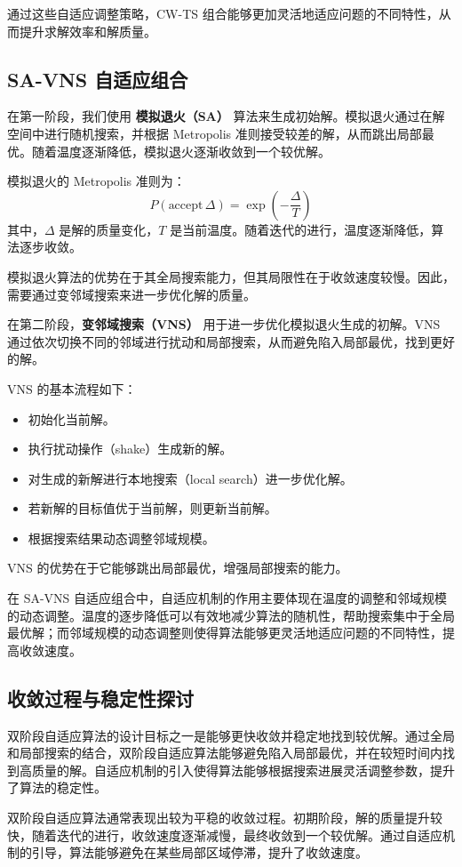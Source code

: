 \documentclass[12pt,a4paper,twoside]{ctexbook}
\begin{document}
通过这些自适应调整策略，CW-TS 组合能够更加灵活地适应问题的不同特性，从而提升求解效率和解质量。

\subsection{SA-VNS 自适应组合}
在第一阶段，我们使用 \textbf{模拟退火（SA）} 算法来生成初始解。模拟退火通过在解空间中进行随机搜索，并根据 Metropolis 准则接受较差的解，从而跳出局部最优。随着温度逐渐降低，模拟退火逐渐收敛到一个较优解。

模拟退火的 Metropolis 准则为：
\[
P(\text{accept}\,\Delta) = \exp\left(-\frac{\Delta}{T}\right)
\]
其中，$\Delta$ 是解的质量变化，$T$ 是当前温度。随着迭代的进行，温度逐渐降低，算法逐步收敛。

模拟退火算法的优势在于其全局搜索能力，但其局限性在于收敛速度较慢。因此，需要通过变邻域搜索来进一步优化解的质量。

在第二阶段，\textbf{变邻域搜索（VNS）} 用于进一步优化模拟退火生成的初解。VNS 通过依次切换不同的邻域进行扰动和局部搜索，从而避免陷入局部最优，找到更好的解。

VNS 的基本流程如下：
\begin{itemize}
    \item 初始化当前解。
    \item 执行扰动操作（shake）生成新的解。
    \item 对生成的新解进行本地搜索（local search）进一步优化解。
    \item 若新解的目标值优于当前解，则更新当前解。
    \item 根据搜索结果动态调整邻域规模。
\end{itemize}

VNS 的优势在于它能够跳出局部最优，增强局部搜索的能力。


在 SA-VNS 自适应组合中，自适应机制的作用主要体现在温度的调整和邻域规模的动态调整。温度的逐步降低可以有效地减少算法的随机性，帮助搜索集中于全局最优解；而邻域规模的动态调整则使得算法能够更灵活地适应问题的不同特性，提高收敛速度。

\subsection{收敛过程与稳定性探讨}
双阶段自适应算法的设计目标之一是能够更快收敛并稳定地找到较优解。通过全局和局部搜索的结合，双阶段自适应算法能够避免陷入局部最优，并在较短时间内找到高质量的解。自适应机制的引入使得算法能够根据搜索进展灵活调整参数，提升了算法的稳定性。

双阶段自适应算法通常表现出较为平稳的收敛过程。初期阶段，解的质量提升较快，随着迭代的进行，收敛速度逐渐减慢，最终收敛到一个较优解。通过自适应机制的引导，算法能够避免在某些局部区域停滞，提升了收敛速度。
\end{document}
